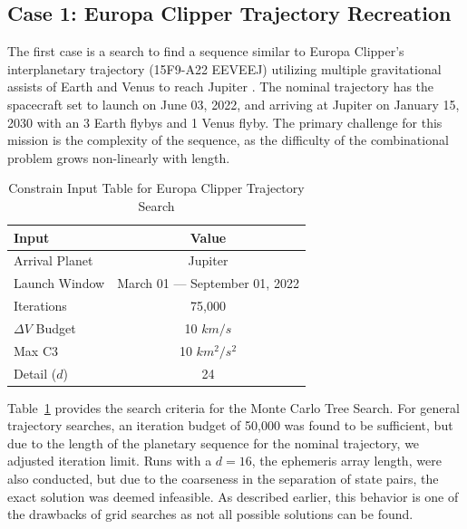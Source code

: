 \documentclass[letterpaper, preprint, paper,11pt]{AAS}	%
\begin{document}
\subsection{Case 1: Europa Clipper Trajectory Recreation}

The first case is a search to find a sequence similar to Europa Clipper's interplanetary trajectory (15F9-A22 EEVEEJ) utilizing multiple gravitational assists of Earth and Venus to reach Jupiter \cite{Buffington2014}. The nominal trajectory has the spacecraft set to launch on June 03, 2022, and arriving at Jupiter on January 15, 2030 with an 3 Earth flybys and 1 Venus flyby. The primary challenge for this mission is the complexity of the sequence, as the difficulty of the combinational problem grows non-linearly with length.

\begin{table}[htb]
    \centering
    \caption{Constrain Input Table for Europa Clipper Trajectory Search}
    \label{table:clipInputs}
    \begin{tabular}{lc}
        \toprule
        \textbf{Input} & \textbf{Value}\\
        \midrule
        Arrival Planet & Jupiter \\
        Launch Window \hspace{1em}& March 01 --- September 01, 2022 \\
        Iterations & 75,000 \\
        $\Delta V$ Budget & 10 $km/s$ \\
        Max C3 & 10 $km^2/s^2$ \\
        Detail ($d$) & 24 \\
        \bottomrule
    \end{tabular}
\end{table}

Table~\ref*{table:clipInputs} provides the search criteria for the Monte Carlo Tree Search. For general trajectory searches, an iteration budget of 50,000 was found to be sufficient, but due to the length of the planetary sequence for the nominal trajectory, we adjusted iteration limit. Runs with a $d = 16$, the ephemeris array length, were also conducted, but due to the coarseness in the separation of state pairs, the exact solution was deemed infeasible. As described earlier, this behavior is one of the drawbacks of grid searches as not all possible solutions can be found.
\end{document}
